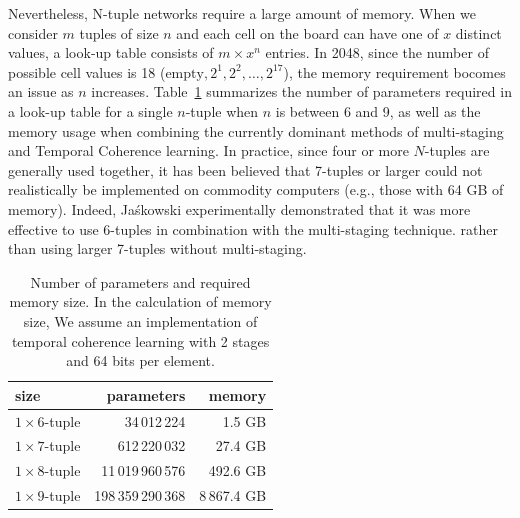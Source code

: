 Nevertheless, N-tuple networks require a large amount of memory.
When we consider $m$ tuples of size $n$ and each cell on the board can have one of $x$ distinct values, a look-up table consists of $m \times x^n$ entries.
In 2048, since the number of possible cell values is 18 ($\mbox{empty}, 2^1, 2^2, \ldots, 2^{17}$), the memory requirement bocomes an issue as $n$ increases.
Table~\ref{table:NTupleMemory} summarizes the number of parameters required in a look-up table for a single $n$-tuple when $n$ is between 6 and 9, as well as the memory usage when combining the currently dominant methods of multi-staging and Temporal Coherence learning.
In practice, since four or more $N$-tuples are generally used together, it has been believed that 7-tuples or larger could not realistically be implemented on commodity computers (e.g., those with 64 GB of memory).
Indeed, Ja\'skowski experimentally demonstrated that it was more effective to use 6-tuples in combination with the multi-staging technique. rather than using larger 7-tuples without multi-staging.

\begin{table}
\setlength{\doublerulesep}{.4pt}
 \caption{Number of parameters and required memory size.  In the calculation of memory size, We assume an implementation of temporal coherence learning with 2 stages and 64 bits per element.}
\label{table:NTupleMemory}
 \begin{tabular}{l|rr}
\hline\hline
  size & parameters & memory \\
\hline
  $1 \times 6$-tuple & 34\,012\,224 & 1.5 GB \\
  $1 \times 7$-tuple & 612\,220\,032 & 27.4 GB \\
  $1 \times 8$-tuple & 11\,019\,960\,576 & 492.6 GB \\
  $1 \times 9$-tuple & 198\,359\,290\,368 & 8\,867.4 GB \\
\hline
 \end{tabular}
\end{table}

